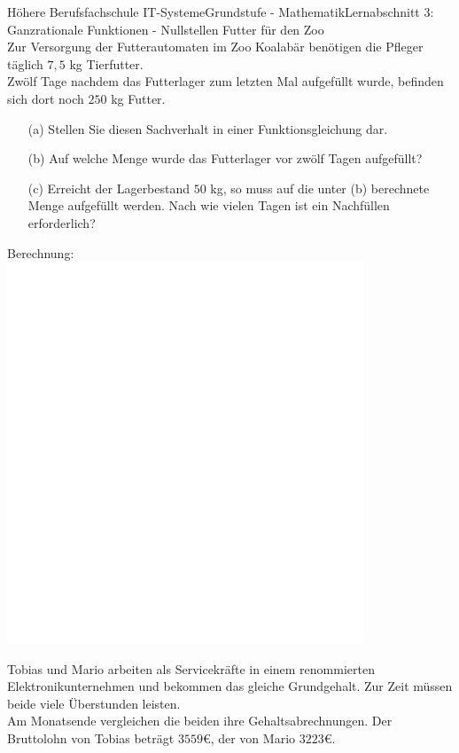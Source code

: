 \documentclass[oneside,openany,headings=optiontotoc,11pt,numbers=noenddot]{scrreprt}
\begin{document}
\begin{worksheet}{Höhere Berufsfachschule IT-Systeme}{Grundstufe - Mathematik}{Lernabschnitt 3: Ganzrationale Funktionen - Nullstellen}
		\setcounter{page}{1}
		\noindent
		\LARGE Futter für den Zoo\\
		\normalsize
		\noindent
		Zur Versorgung der Futterautomaten im Zoo \grqq{}Koalabär\grqq{} benötigen die Pfleger täglich \(7,5\) kg Tierfutter.\\
		Zwölf Tage nachdem das Futterlager zum letzten Mal aufgefüllt wurde, befinden sich dort noch \(250\) kg Futter.
		\begin{itemize}
			\item[(a)] Stellen Sie diesen Sachverhalt in einer Funktionsgleichung dar.
			\item[(b)] Auf welche Menge wurde das Futterlager vor zwölf Tagen aufgefüllt?
			\item[(c)] Erreicht der Lagerbestand \(50\) kg, so muss auf die unter (b) berechnete Menge aufgefüllt werden. Nach wie vielen Tagen ist ein Nachfüllen erforderlich?
		\end{itemize}
		\begin{framed}
			\noindent
			\small{\color{codegray}Berechnung:}\\
			\includegraphics[width=0.8\textwidth]{../../empty.jpg}\\
		\end{framed}
		\normalsize
		\newpage
		\noindent
		Tobias und Mario arbeiten als Servicekräfte in einem renommierten Elektronikunternehmen und bekommen das gleiche Grundgehalt. Zur Zeit müssen beide viele Überstunden leisten.\\
		Am Monatsende vergleichen die beiden ihre Gehaltsabrechnungen. Der Bruttolohn von Tobias beträgt \(3559\)\euro{}, der von Mario \(3223\)\euro{}.\\

\end{worksheet}
\end{document}
